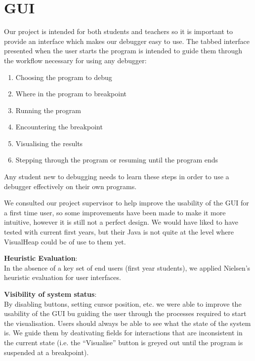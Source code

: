 \documentclass[11pt, a4paper]{report}
\begin{document}
\section{GUI}

Our project is intended for both students and teachers so it is important to provide an interface which makes our debugger easy to use. The tabbed interface presented when the user starts the program is intended to guide them through the workflow necessary for using any debugger:

\begin{enumerate}

  \item Choosing the program to debug
  \item Where in the program to breakpoint
  \item Running the program
  \item Encountering the breakpoint
  \item Visualising the results
  \item Stepping through the program or resuming until the program ends
  
\end{enumerate}

Any student new to debugging needs to learn these steps in order to use a debugger effectively on their own programs.

We consulted our project supervisor to help improve the usability of the GUI for a first time user, so some improvements have been made to make it more intuitive, however it is still not a perfect design. We would have liked to have tested with current first years, but their Java is not quite at the level where VisualHeap could be of use to them yet. 

{\bfseries Heuristic Evaluation}: \\
In the absence of a key set of end users (first year students), we applied Nielsen’s heuristic evaluation for user interfaces.

{\bfseries Visibility of system status}: \\
By disabling buttons, setting cursor position, etc. we were able to improve the usability of the GUI bu guiding the user through the processes required to start the visualisation. Users should always be able to see what the state of the system is. We guide them by deativating fields for interactions that are inconsistent in the current state (i.e. the “Visualise” button is greyed out until the program is suspended at a breakpoint).
\end{document}
